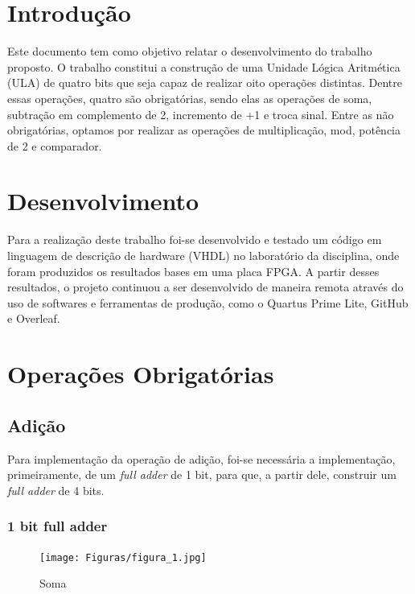 \documentclass[a4paper, 12pt]{article}
\begin{document}
\newpage
{}

\section{Introdução}

Este documento tem como objetivo relatar o desenvolvimento do trabalho proposto. O trabalho constitui a construção de uma Unidade Lógica Aritmética (ULA) de quatro bits que seja capaz de realizar oito operações distintas. Dentre essas operações, quatro são obrigatórias, sendo elas as operações de soma, subtração em complemento de 2, incremento de +1 e troca sinal. Entre as não obrigatórias, optamos por realizar as operações de multiplicação, mod, potência de 2 e comparador.
\section{Desenvolvimento}

Para a realização deste trabalho foi-se desenvolvido e testado um código em linguagem de descrição de hardware (VHDL) no laboratório da disciplina, onde foram produzidos os resultados bases em uma placa FPGA. A partir desses resultados, o projeto continuou a ser desenvolvido de maneira remota através do uso de softwares e ferramentas de produção, como o Quartus Prime Lite, GitHub e Overleaf. 

\section{Operações Obrigatórias}


\subsection{Adição}


Para implementação da operação de adição, foi-se necessária a implementação, primeiramente, de um \textit{full adder} de 1 bit, para que, a partir dele, construir um \textit{full adder} de 4 bits.

\subsubsection{1 bit full adder}

\begin{figure}[H]
\caption{Soma}
\centering
\texttt{[image: Figuras/figura\_1.jpg]}
\label{figura:qualquernome}
\end{figure}
\end{document}
